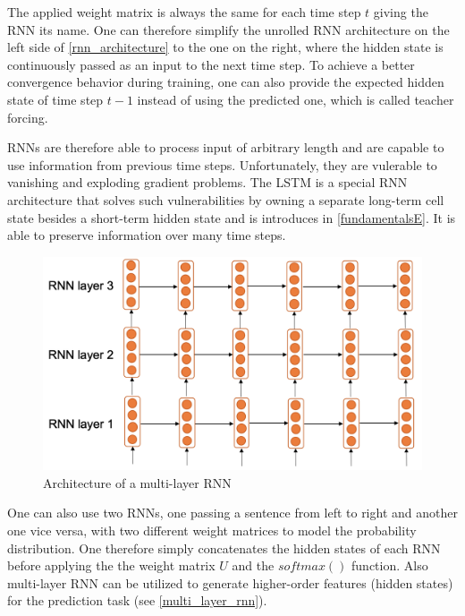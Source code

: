 The applied weight matrix is always the same for each time step $t$ giving the \ac{RNN} its name. One can therefore simplify the unrolled \ac{RNN} architecture on the left side of \autoref{rnn_architecture} to the one on the right, where the hidden state is continuously passed as an input to the next time step. To achieve a better convergence behavior during training, one can also provide the expected hidden state of time step $t-1$ instead of using the predicted one, which is called teacher forcing. \cite{Gertz2020}

\acp{RNN} are therefore able to process input of arbitrary length and are capable to use information from previous time steps. Unfortunately, they are vulerable to vanishing and exploding gradient problems. The \ac{LSTM} is a special \ac{RNN} architecture that solves such vulnerabilities by owning a separate long-term cell state besides a short-term hidden state and is introduces in \autoref{fundamentalsE}. It is able to preserve information over many time steps. \cite{Gertz2020}

\begin{figure}[ht]
	\centering
	\includegraphics[width=0.8\linewidth]{figures/multi_layer_rnn.png}
	\caption{Architecture of a multi-layer  \ac{RNN} \cite{Gertz2020}}
	\label{multi_layer_rnn}
\end{figure}

One can also use two \acp{RNN}, one passing a sentence from left to right and another one vice versa, with two different weight matrices to model the probability distribution. One therefore simply concatenates the hidden states of each \ac{RNN} before applying the the weight matrix $U$ and the $softmax()$ function. Also multi-layer \acs{RNN} can be utilized to generate higher-order features (hidden states) for the prediction task (see \autoref{multi_layer_rnn}).

